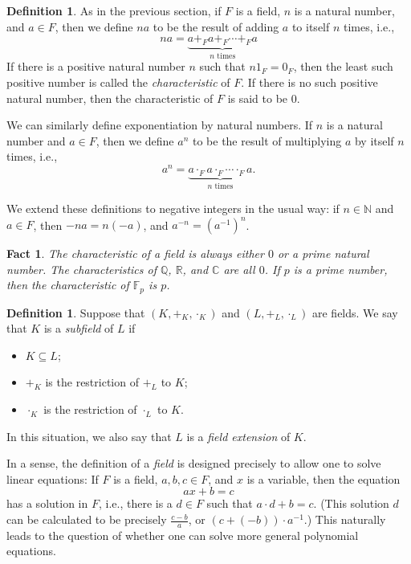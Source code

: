 \documentclass[a4paper]{memoir}
\newtheorem{fact}[theorem]{Fact}
\theoremstyle{definition}
\newtheorem{definition}[theorem]{Definition}
\newcommand{\bb}{\mathbb}
\begin{document}
\begin{definition}
  As in the previous section, if $F$ is a field, $n$ is a natural number, and 
  $a \in F$, then we define $na$ to be the result of adding $a$ to itself $n$ times, i.e., 
  \[
    na = \underbrace{a +_F a +_F \cdots +_F a}_{\text{$n$ times}}
  \]
  If there is a positive natural number $n$ such that $n 1_F = 0_F$, then the least such 
  positive number is called the \emph{characteristic} of $F$. If there is no such 
  positive natural number, then the characteristic of $F$ is said to be $0$.
  
  We can similarly define exponentiation by natural numbers. If $n$ is a natural number 
  and $a \in F$, then we define $a^n$ to be the result of multiplying $a$ by itself $n$ times, 
  i.e.,
  \[
    a^n = \underbrace{a \cdot_F a \cdot_F \cdots \cdot_F a}_{\text{$n$ times}}.
  \]
  
  We extend these definitions to negative integers in the usual way: if $n \in \bb{N}$ and 
  $a \in F$, then $-na = n(-a)$, and $a^{-n} = (a^{-1})^n$.
\end{definition}

\begin{fact}
  The characteristic of a field is always either $0$ or a prime natural number. The 
  characteristics of $\bb{Q}$, $\bb{R}$, and $\bb{C}$ are all $0$. If $p$ is a prime number, 
  then the characteristic of $\bb{F}_p$ is $p$.
\end{fact}

\begin{definition}
  Suppose that $(K, +_K, \cdot_K)$ and $(L, +_L, \cdot_L)$ are fields. We say that 
  $K$ is a \emph{subfield} of $L$ if
  \begin{itemize}
    \item $K \subseteq L$;
    \item $+_K$ is the restriction of $+_L$ to $K$;
    \item $\cdot_K$ is the restriction of $\cdot_L$ to $K$.
  \end{itemize}
  In this situation, we also say that $L$ is a \emph{field extension} of $K$.
\end{definition}

In a sense, the definition of a \emph{field} is designed precisely to allow one to solve 
linear equations: If $F$ is a field, $a,b,c \in F$, and $x$ is a variable, then the equation
\[
  ax + b = c
\]
has a solution in $F$, i.e., there is a $d \in F$ such that $a \cdot d + b = c$. 
(This solution $d$ can be calculated to be precisely $\frac{c-b}{a}$, or 
$(c + (-b)) \cdot a^{-1}$.) This naturally leads to the question of whether one can solve 
more general polynomial equations.
\end{document}
